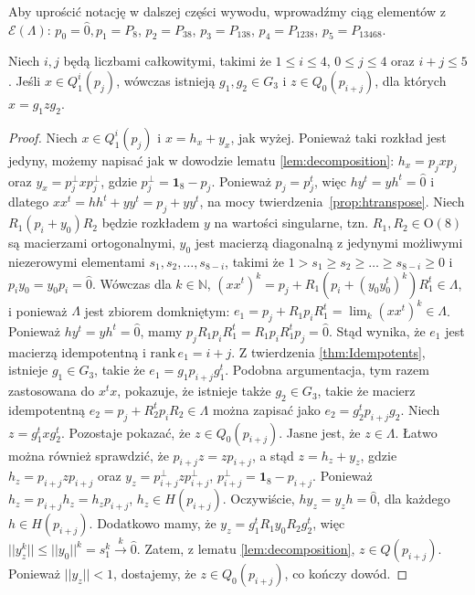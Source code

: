 {Aby uprościć notację w dalszej części wywodu,
wprowadźmy ciąg elementów z $\mathcal{E}(\Lambda)$:
$p_{0} = \hat{0}, p_{1} = P_{8}$, $p_{2} = P_{38}$,
$p_{3} = P_{138}$, $p_{4} = P_{1238}$, $p_{5} = P_{13468}$.
\begin{Theorem}
\label{thm:LowerIndices}
    Niech $i,j$ będą liczbami całkowitymi, takimi że
    $1 \leq i \leq 4$, $0 \leq j \leq 4$ oraz $i+j \leq 5$.
Jeśli $x \in Q_{1}^{i}(p_{j})$,
wówczas istnieją $g_{1}, g_{2} \in G_{3}$ i $z \in Q_{0}(p_{i+j})$,
dla których $x = g_{1} z g_{2}$.
\end{Theorem}
\begin{proof}
    Niech $x \in Q_{1}^{i}(p_{j})$ i
    $x = h_{x} + y_{x}$, jak wyżej.
    Ponieważ taki rozkład jest jedyny, możemy napisać jak w dowodzie
    lematu \ref{lem:decomposition}:
    $h_{x} = p_{j} x p_{j}$ oraz $y_{x} = p_{j}^{\perp} x p_{j}^{\perp}$,
    gdzie $p_{j}^{\perp} = \mathbf{1}_{8} - p_{j}$.
    Ponieważ $p_{j} = p_{j}^{t}$, więc
    $h y^{t} = y h^{t} = \hat{0}$ i dlatego
    $x x^{t}  = h h^{t} + y y^{t} = p_{j} + y y^{t}$,
    na mocy \mbox{twierdzenia \ref{prop:htranspose}}.
    Niech $R_{1} (p_{i} + y_{0}) R_{2}$ będzie rozkładem $y$ na wartości
    singularne, tzn. $R_{1}, R_{2} \in \text{O}(8)$ są macierzami ortogonalnymi,
    $y_{0}$ jest macierzą diagonalną z jedynymi możliwymi niezerowymi elementami
    $s_{1}, s_{2}, \ldots, s_{8-i}$, takimi że
    $1 > s_{1} \geq s_{2} \geq \ldots \geq s_{8-i} \geq 0$
    i $p_{i} y_{0} = y_{0} p_{i} = \hat{0}$.
    Wówczas dla $k \in \mathbb{N}$,
    $(x x^{t})^{k} = p_{j} + R_{1}( p_{i} + (y_{0} y_{0}^{t})^{k}) R_{1}^{t} \in \Lambda$,
    i ponieważ $\Lambda$ jest zbiorem domkniętym:
    $e_{1} = p_{j} + R_{1} p_{i} R_{1}^{t} = \lim_{k} (x x^{t})^{k} \in \Lambda$.
    Ponieważ $h y^{t} = y h^{t} = \hat{0}$,
    mamy $p_{j} R_{1} p_{i} R_{1}^{t} = R_{1} p_{i} R_{1}^{t} p_{j} = \hat{0}$.
    Stąd wynika, że $e_{1}$ jest macierzą idempotentną i
    $\text{rank} \, e_{1} = i+j$.
    Z twierdzenia \ref{thm:Idempotents}, istnieje $g_{1} \in G_{3}$, takie że
    $e_{1} = g_{1} p_{i+j} g_{1}^{t}$.
    Podobna argumentacja,
    tym razem zastosowana do $x^{t} x$, pokazuje,
    że istnieje także $g_{2} \in G_{3}$,
    takie że macierz idempotentną
    $e_{2} = p_{j} + R_{2}^{t} p_{i} R_{2} \in \Lambda$
    można zapisać jako $e_{2} = g_{2}^{t} p_{i+j} g_{2}$.
    Niech $z = g_{1}^{t} x g_{2}^{t}$.
    Pozostaje pokazać, że $z \in Q_{0}(p_{i+j})$.
    Jasne jest, że $z \in \Lambda$.
    Łatwo można również sprawdzić, że $p_{i+j} z = z p_{i+j}$,
    a stąd $z = h_{z} + y_{z}$, gdzie $h_{z} = p_{i+j} z p_{i+j}$
    oraz $y_{z} = p_{i+j}^{\perp} z p_{i+j}^{\perp}$,
    $p_{i+j}^{\perp} = \mathbf{1}_{8} - p_{i+j}$.
    Ponieważ $h_{z} = p_{i+j} h_{z} = h_{z} p_{i+j}$,
    $h_{z} \in H(p_{i+j})$.
    Oczywiście, $h y_{z} = y_{z} h = \hat{0}$, dla każdego $h \in H(p_{i+j})$.
    Dodatkowo mamy, że
    $y_{z} = g_{1}^{t}R_{1} y_{0} R_{2} g_{2}^{t}$, więc
    $||y_{z}^{k}|| \leq ||y_{0}||^{k} = s_{1}^{k} \overset{k}{\rightarrow} \hat{0}$.
    Zatem, z lematu \ref{lem:decomposition}, $z \in Q(p_{i+j})$.
    Ponieważ $||y_{z}|| < 1$, dostajemy, że
    $z \in Q_{0}(p_{i+j})$, co kończy dowód.
\end{proof}

}
